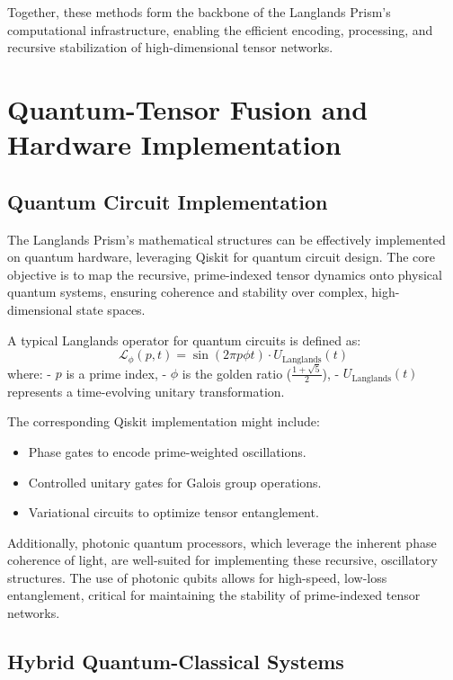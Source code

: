\documentclass[11pt]{article}
\begin{document}
Together, these methods form the backbone of the Langlands Prism's computational infrastructure, enabling the efficient encoding, processing, and recursive stabilization of high-dimensional tensor networks.

\section{Quantum-Tensor Fusion and Hardware Implementation}

\subsection{Quantum Circuit Implementation}

The Langlands Prism's mathematical structures can be effectively implemented on quantum hardware, leveraging Qiskit for quantum circuit design. The core objective is to map the recursive, prime-indexed tensor dynamics onto physical quantum systems, ensuring coherence and stability over complex, high-dimensional state spaces.

A typical Langlands operator for quantum circuits is defined as:
\[
\mathcal{L}_{\phi}(p, t) = \sin(2\pi p \phi t) \cdot U_{\text{Langlands}}(t)
\]
where:
- \(p\) is a prime index,
- \(\phi\) is the golden ratio (\(\frac{1 + \sqrt{5}}{2}\)),
- \(U_{\text{Langlands}}(t)\) represents a time-evolving unitary transformation.

The corresponding Qiskit implementation might include:
\begin{itemize}
    \item Phase gates to encode prime-weighted oscillations.
    \item Controlled unitary gates for Galois group operations.
    \item Variational circuits to optimize tensor entanglement.
\end{itemize}

Additionally, photonic quantum processors, which leverage the inherent phase coherence of light, are well-suited for implementing these recursive, oscillatory structures. The use of photonic qubits allows for high-speed, low-loss entanglement, critical for maintaining the stability of prime-indexed tensor networks.

\subsection{Hybrid Quantum-Classical Systems}
\end{document}
